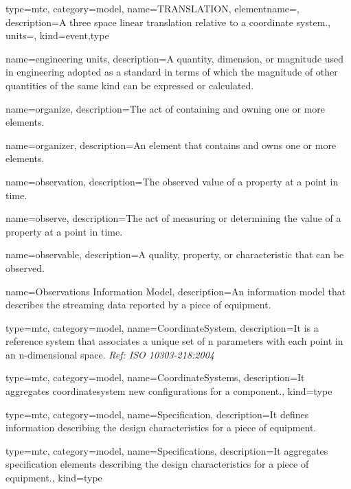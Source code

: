 {
  type=mtc,
  category=model,
  name={TRANSLATION},
  elementname=,
  description={A three space linear translation relative to a coordinate system.},
  units=,
  kind={event,type}
}


{
  name={engineering units},
  description={A quantity, dimension, or magnitude used in engineering adopted as a standard in terms of which the magnitude of other quantities of the same kind can be expressed or calculated.}
}


{
  name={organize},
  description={The act of containing and owning one or more elements.}
}


{
  name={organizer},
  description={An element that contains and owns one or more elements.}
}


{
  name={observation},
  description={The observed value of a property at a point in time.}
}


{
  name={observe},
  description={The act of measuring or determining the value of a property at a point in time.}
}


{
  name={observable},
  description={A quality, property, or characteristic that can be observed.}
}

{
  name={Observations Information Model},
  description={An \gls{information model} that describes the \gls{streaming data} reported by a piece of equipment.}
}

{
  type=mtc,
  category=model,
  name={CoordinateSystem},
  description={It is a reference system that associates a unique set of n parameters with each point in an n-dimensional space. \textit{Ref: ISO 10303-218:2004}}
}


{
  type=mtc,
  category=model,
  name={CoordinateSystems},
  description={It aggregates \gls{coordinatesystem new} configurations for a \gls{component}.},
  kind={type}
}

{
  type=mtc,
  category=model,
  name={Specification},
  description={It defines information describing the design characteristics for a piece of equipment.}
}


{
  type=mtc,
  category=model,
  name={Specifications},
  description={It aggregates \gls{specification} elements describing the design characteristics for a piece of equipment.},
  kind={type}
}



